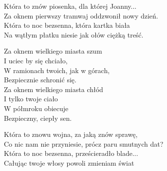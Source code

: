 \begin{text}
    Która to znów piosenka, dla której Joanny...\\
    Za oknem pierwszy tramwaj oddzwonił nowy dzień.\\
    Która to noc bezsenna, która kartka biała\\
    Na wątłym płatku niesie jak ołów ciężką treść.

    Za oknem wielkiego miasta szum\\
    I uciec by się chciało,\\
    W ramionach twoich, jak w górach,\\
    Bezpiecznie schronić się.\\
    Za oknem wielkiego miasta chłód\\
    I tylko twoje ciało\\
    W półmroku obiecuje\\
    Bezpieczny, ciepły sen.

    Która to znowu wojna, za jaką znów sprawę,\\
    Co nic nam nie przyniesie, prócz paru smutnych dat?\\
    Która to noc bezsenna, prześcieradło blade...\\
    Całując twoje włosy powoli zmieniam świat
\end{text}
\begin{chord}

\end{chord}